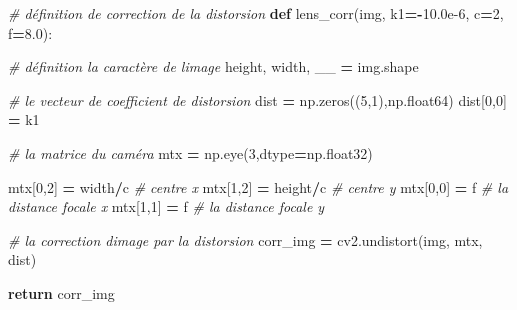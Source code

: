 \documentclass[
]{article}
\newenvironment{Shaded}{\begin{snugshade}}{\end{snugshade}}
\newcommand{\CommentTok}[1]{\textcolor[rgb]{0.56,0.35,0.01}{\textit{#1}}}
\newcommand{\ControlFlowTok}[1]{\textcolor[rgb]{0.13,0.29,0.53}{\textbf{#1}}}
\newcommand{\DecValTok}[1]{\textcolor[rgb]{0.00,0.00,0.81}{#1}}
\newcommand{\FloatTok}[1]{\textcolor[rgb]{0.00,0.00,0.81}{#1}}
\newcommand{\KeywordTok}[1]{\textcolor[rgb]{0.13,0.29,0.53}{\textbf{#1}}}
\newcommand{\NormalTok}[1]{#1}
\newcommand{\OperatorTok}[1]{\textcolor[rgb]{0.81,0.36,0.00}{\textbf{#1}}}
\begin{document}
\begin{Shaded}
\begin{Highlighting}[]
\CommentTok{\# définition de correction de la distorsion }
\KeywordTok{def}\NormalTok{ lens\_corr(img, k1}\OperatorTok{={-}}\FloatTok{10.0e{-}6}\NormalTok{, c}\OperatorTok{=}\DecValTok{2}\NormalTok{, f}\OperatorTok{=}\FloatTok{8.0}\NormalTok{):}
 
    \CommentTok{\# définition la caractère de l\textquotesingle{}image }
\NormalTok{    height, width, \_\_ }\OperatorTok{=}\NormalTok{ img.shape}

    \CommentTok{\# le vecteur de coefficient de distorsion}
\NormalTok{    dist }\OperatorTok{=}\NormalTok{ np.zeros((}\DecValTok{5}\NormalTok{,}\DecValTok{1}\NormalTok{),np.float64)}
\NormalTok{    dist[}\DecValTok{0}\NormalTok{,}\DecValTok{0}\NormalTok{] }\OperatorTok{=}\NormalTok{ k1}
    
    \CommentTok{\# la matrice du caméra}
\NormalTok{    mtx }\OperatorTok{=}\NormalTok{ np.eye(}\DecValTok{3}\NormalTok{,dtype}\OperatorTok{=}\NormalTok{np.float32)}

\NormalTok{    mtx[}\DecValTok{0}\NormalTok{,}\DecValTok{2}\NormalTok{] }\OperatorTok{=}\NormalTok{ width}\OperatorTok{/}\NormalTok{c     }\CommentTok{\# centre x}
\NormalTok{    mtx[}\DecValTok{1}\NormalTok{,}\DecValTok{2}\NormalTok{] }\OperatorTok{=}\NormalTok{ height}\OperatorTok{/}\NormalTok{c    }\CommentTok{\# centre y}
\NormalTok{    mtx[}\DecValTok{0}\NormalTok{,}\DecValTok{0}\NormalTok{] }\OperatorTok{=}\NormalTok{ f           }\CommentTok{\# la distance focale x}
\NormalTok{    mtx[}\DecValTok{1}\NormalTok{,}\DecValTok{1}\NormalTok{] }\OperatorTok{=}\NormalTok{ f           }\CommentTok{\# la distance focale y}

    \CommentTok{\# la correction d\textquotesingle{}image par la distorsion}
\NormalTok{    corr\_img }\OperatorTok{=}\NormalTok{ cv2.undistort(img, mtx, dist)}

    \ControlFlowTok{return}\NormalTok{ corr\_img}
\end{Highlighting}
\end{Shaded}
\end{document}
